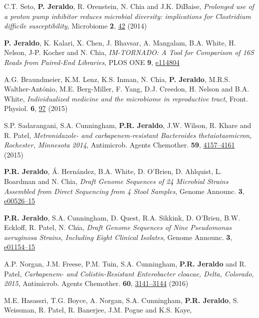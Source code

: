 \documentclass[letterpaper]{article}
\renewenvironment{itemize}{
  \begin{list}{}{
    \setlength{\leftmargin}{1.5em}
  }
}{
  \end{list}
}
\begin{document}
\begin{itemize}
\item C.T. Seto, \textbf{P. Jeraldo}, R. Orenstein, N. Chia and J.K. DiBaise,
\textit{Prolonged use of a proton pump inhibitor reduces microbial diversity: implications for Clostridium difficile susceptibility}, Microbiome \textbf{2}, \href{http://dx.doi.org/10.1186/2049-2618-2-42}{42} (2014)
\item \textbf{P. Jeraldo}, K. Kalari, X. Chen, J. Bhavsar, A. Mangalam, B.A. White, H. Nelson, J-P. Kocher and N. Chia, \textit{IM-TORNADO: A Tool for Comparison of 16S Reads from Paired-End Libraries}, PLOS ONE \textbf{9}, \href{http://dx.plos.org/10.1371/journal.pone.0114804}{e114804}
\item A.G. Braundmeier, K.M. Lenz, K.S. Inman, N. Chia, \textbf{P. Jeraldo}, M.R.S. Walther-António, M.E. Berg-Miller, F. Yang, D.J. Creedon, H. Nelson and B.A. White,
\textit{Individualized medicine and the microbiome in reproductive tract}, Front. Physiol. \textbf{6},
\href{http://dx.doi.org/10.3389/fphys.2015.00097}{97} (2015)
\item S.P. Sadarangani, S.A. Cunningham, \textbf{P.R. Jeraldo}, J.W. Wilson, R. Khare and R. Patel,
\textit{Metronidazole- and carbapenem-resistant Bacteroides thetaiotaomicron, Rochester, Minnesota 2014},
Antimicrob. Agents Che\-mo\-ther. \textbf{59}, \href{http://dx.doi.org/10.1128/AAC.00677-15}{4157--4161} (2015)
\item \textbf{P.R. Jeraldo}, Á. Hernández, B.A. White, D. O’Brien, D. Ahlquist, L. Boardman and N. Chia,
\textit{Draft Genome Sequences of 24 Microbial Strains Assembled from Direct Sequencing from 4 Stool Samples},
Genome Announc. \textbf{3}, \href{http://dx.doi.org/10.1128/genomeA.00526-15}{e00526--15}
\item \textbf{P.R. Jeraldo}, S.A. Cunningham, D. Quest, R.A. Sikkink, D. O’Brien, B.W. Eckloff, R. Patel, N. Chia,
\textit{Draft Genome Sequences of Nine Pseudomonas aeruginosa Strains, Including Eight Clinical Isolates},
Genome Announc. \textbf{3}, \href{http://dx.doi.org/10.1128/genomeA.01154-15}{e01154--15}
\item A.P. Norgan, J.M. Freese, P.M. Tuin, S.A. Cunningham, \textbf{P.R. Jeraldo} and R. Patel,
\textit{Carbapenem- and Colistin-Resistant Enterobacter cloacae, Delta, Colorado, 2015},
Antimicrob. Agents Chemother. \textbf{60}, \href{http://dx.doi.org/10.1128/AAC.03055-15}{3141--3144} (2016)
\item M.E. Hasassri, T.G. Boyce, A. Norgan, S.A. Cunningham, \textbf{P.R. Jeraldo}, S. Weissman, R. Patel, R. Banerjee, J.M. Pogue and K.S. Kaye,

\end{itemize}
\end{document}
